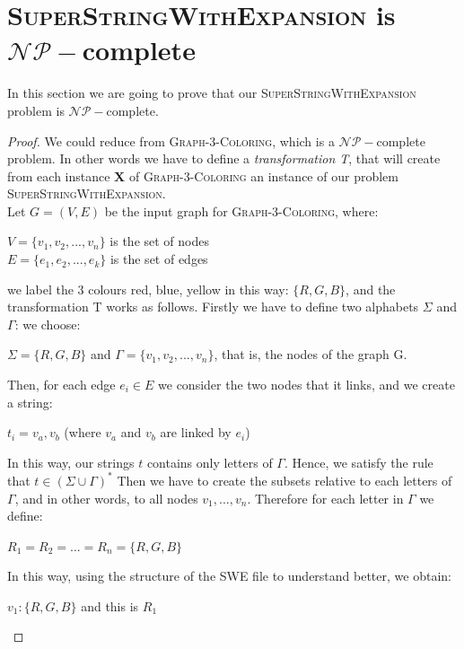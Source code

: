 \documentclass[paper=a4, fontsize=11pt]{scrartcl}
\numberwithin{equation}{section}		%
\numberwithin{figure}{section}			%
\numberwithin{table}{section}				%
\begin{document}
\section{\textsc{SuperStringWithExpansion} is $\mathcal{NP}-$complete}
In this section we are going to prove that our \textsc{SuperStringWithExpansion} problem is $\mathcal{NP}-$complete. 
\begin{proof}
     We could reduce from \textsc{Graph-3-Coloring}, which is a $\mathcal{NP}-$complete problem. In other words we have to define a \textit{transformation T}, that will create from each instance \textbf{X} of \textsc{Graph-3-Coloring} an instance of our problem \textsc{SuperStringWithExpansion}. \newline
     \\
     Let $G=(V,E)$ be the input graph for \textsc{Graph-3-Coloring}, where:
     \begin{center}
     	$V=\{v_1,v_2,...,v_n\}$ is the set of nodes \\
     	$E=\{e_1,e_2,...,e_k\}$ is the set of edges
     \end{center}
     we label the 3 colours red, blue, yellow in this way: $\{R,G,B\}$, and the transformation T works as follows. \newline
     Firstly we have to define two alphabets $\Sigma$ and $\Gamma$: we choose:
     \begin{center}
     	$\Sigma=\{R,G,B\}$ and $\Gamma=\{v_1,v_2,...,v_n\}$, that is, the nodes of the graph G.
     \end{center}
     Then, for each edge $e_i\in E$ we consider the two nodes that it links, and we create a string:
     \begin{center}
     	$t_i=v_a,v_b$ (where $v_a$ and $v_b$ are linked by $e_i$)  
     \end{center}
     In this way, our strings $t$ contains only letters of $\Gamma$. Hence, we satisfy the rule that $t \in (\Sigma \cup \Gamma)^*$ \newline
     Then we have to create the subsets relative to each letters of $\Gamma$, and in other words, to all nodes $v_1,...,v_n$.
     Therefore for each letter in $\Gamma$ we define:
     \begin{center}
     	$R_1=R_2=...=R_n=\{R,G,B\}$
     \end{center}
     In this way, using the structure of the SWE file to understand better, we obtain:
     \begin{center}
     	$v_1: \{R,G,B\}$ and this is $R_1$ \\

\end{center}
\end{proof}
\end{document}
